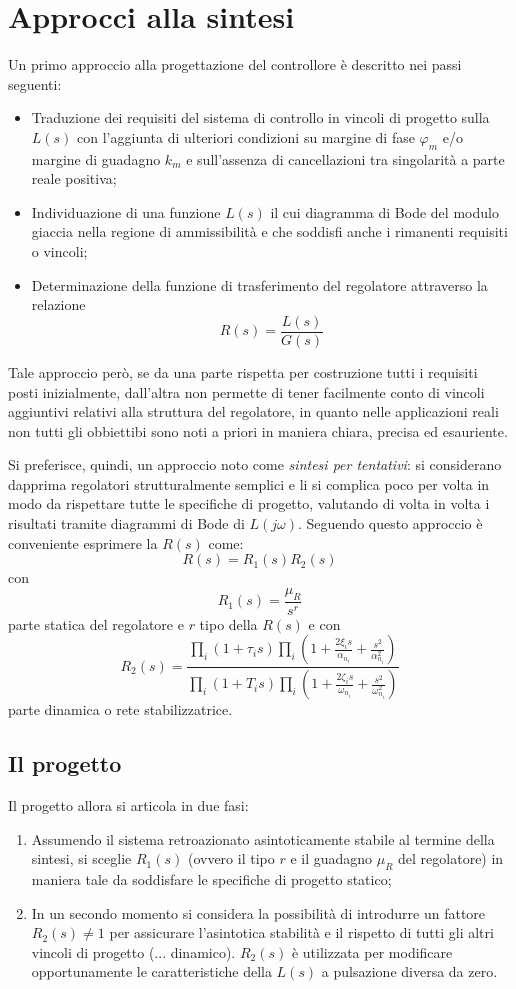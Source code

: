 \documentclass[a4paper]{report}
\begin{document}
\chapter{Approcci alla sintesi}
Un primo approccio alla progettazione del controllore \`e descritto
nei passi seguenti:
\begin{itemize}
\item Traduzione dei requisiti del sistema di controllo in vincoli di
  progetto sulla $L(s)$ con l'aggiunta di ulteriori condizioni su
  margine di fase $\varphi_m$ e/o margine di guadagno $k_m$ e
  sull'assenza di cancellazioni tra singolarit\`a a parte reale
  positiva;
\item Individuazione di una funzione $L(s)$ il cui diagramma di Bode
  del modulo giaccia nella regione di ammissibilit\`a e che soddisfi
  anche i rimanenti requisiti o vincoli;
\item Determinazione della funzione di trasferimento del regolatore
  attraverso la relazione
  \[
  R(s) = \dfrac{L(s)}{G(s)}
  \]
\end{itemize}
Tale approccio per\`o, se da una parte rispetta per costruzione tutti
i requisiti posti inizialmente, dall'altra non permette di tener
facilmente conto di vincoli aggiuntivi relativi alla struttura del
regolatore, in quanto nelle applicazioni reali non tutti gli
obbiettibi sono noti a priori in maniera chiara, precisa ed
esauriente.

Si preferisce, quindi, un approccio noto come {\em sintesi per
  tentativi}: si considerano dapprima
regolatori strutturalmente semplici e li si complica poco per volta in
modo da rispettare tutte le specifiche di progetto, valutando di volta
in volta i risultati tramite diagrammi di Bode di $L(j
\omega)$. Seguendo questo approccio \`e conveniente esprimere la
$R(s)$ come:
\[
R(s) = R_1(s) R_2(s)
\]
con
\[
R_1(s) = \dfrac{\mu_R}{s^r}
\]
parte statica del regolatore e $r$ tipo della $R(s)$ e con
\[
R_2(s) = \dfrac{\prod_i (1 + \tau_i s) \prod_i (1 + \frac{2\xi_i
    s}{\alpha_{n_i}} + \frac{s^2}{\alpha^2_{n_i}})}{\prod_i (1 + T_i s) \prod_i (1 + \frac{2\zeta_i
    s}{\omega_{n_i}} + \frac{s^2}{\omega^2_{n_i}})}
\]
parte dinamica o rete stabilizzatrice.
\section{Il progetto}
Il progetto allora si articola in due fasi:
\begin{enumerate}
\item Assumendo il sistema retroazionato asintoticamente stabile al
  termine della sintesi, si sceglie $R_1(s)$ (ovvero il tipo $r$ e il
  guadagno $\mu_R$ del regolatore) in maniera tale da soddisfare le
  specifiche di progetto statico;
\item In un secondo momento si considera la possibilit\`a di
  introdurre un fattore $R_2(s) \neq 1$ per assicurare l'asintotica
  stabilit\`a e il rispetto di tutti gli altri vincoli di progetto
  (... dinamico). $R_2(s)$ \`e utilizzata per modificare
  opportunamente le caratteristiche della $L(s)$ a pulsazione diversa
  da zero.
\end{enumerate}
\end{document}
